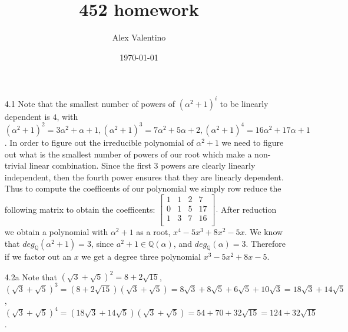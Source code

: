 \documentclass[12pt, letterpaper]{article}
\date{\today}
\author{Alex Valentino}
\title{452 homework}
\newcommand{\Q}{\mathbb{Q}}
\begin{document}
\begin{enumerate}
	\item[4.1] Note that the smallest number of powers of $(\alpha^2+1)^i$ to be linearly 
	dependent is $4$, with $(\alpha^2+1)^2 = 3\alpha^2 + \alpha + 1, 
	(\alpha^2+1)^3 = 7 \alpha^2 + 5\alpha + 2, (\alpha^2+1)^4 = 16\alpha^2 + 17\alpha +1$.
	In order to figure out the irreducible polynomial of $\alpha^2 + 1$ we need to figure out
	what is the smallest number of powers of our root which make  a non-trivial linear
	combination.  Since the first 3 powers are clearly linearly independent, then the fourth 
	power ensures that they are linearly dependent.  Thus to compute the coefficents of our 
	polynomial we simply row reduce the following matrix to obtain the coefficents:
	$\begin{bmatrix}
		1 & 1 & 2 & 7 \\
 0 & 1 & 5 & 17 \\
 1 & 3 & 7 & 16 \\
	\end{bmatrix}.$
	After reduction we obtain a polynomial with $\alpha^2 + 1$ as  a root, 
	$x^4 -5x^3+8x^2 -5x$.  We know that $deg_\Q(\alpha^2+1)=3$, since $a^2 + 1 \in \Q(\alpha)$,
	and $deg_\Q(\alpha) = 3$.  Therefore if we factor out an $x$ we get a degree three 
	polynomial $x^3-5x^2+8x-5$.  
	\item[4.2a] Note that $
	(\sqrt{3} + \sqrt{5})^2 = 8 + 2\sqrt{15}$, $(\sqrt{3} + \sqrt{5})^3= 
	(8 + 2\sqrt{15})(\sqrt{3} + \sqrt{5}) = 8\sqrt{3} + 8\sqrt{5} + 6\sqrt{5} + 10 \sqrt{3} = 
	18\sqrt{3} + 14\sqrt{5}$, $(\sqrt{3} + \sqrt{5})^4 = (18\sqrt{3} + 14\sqrt{5})(\sqrt{3} + \sqrt{5}) = 54 + 70 + 32\sqrt{15} = 124 + 32\sqrt{15}$.  
	

\end{enumerate}
\end{document}
